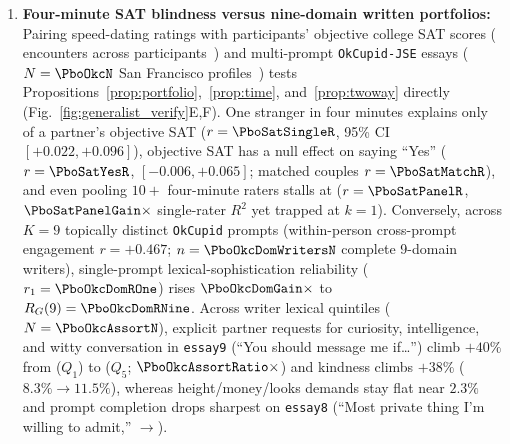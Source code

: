 \begin{enumerate}[leftmargin=1.4em,itemsep=1.5pt,topsep=2pt]
\item \textbf{Four-minute SAT blindness versus nine-domain written portfolios:} Pairing speed-dating ratings with participants' objective college SAT scores (\PboSatDatesN{} encounters across \PboSatPartN{} participants~\cite{fisman2006}) and \PboOkcEssaysN{} multi-prompt \texttt{OkCupid-JSE} essays ($N=\PboOkcN$ San Francisco profiles~\cite{kim2015}) tests Propositions~\ref{prop:portfolio},~\ref{prop:time}, and~\ref{prop:twoway} directly (Fig.~\ref{fig:generalist_verify}E,F). One stranger in four minutes explains only \PboSatSingleRTwo{} of a partner's objective SAT ($r=\PboSatSingleR$, 95\% CI $[+0.022,+0.096]$), objective SAT has a null effect on saying ``Yes'' ($r=\PboSatYesR$, $[-0.006,+0.065]$; matched couples $r=\PboSatMatchR$), and even pooling $10+$ four-minute raters stalls at \PboSatPanelRTwo{} ($r=\PboSatPanelR$, $\PboSatPanelGain\times$ single-rater $R^2$ yet trapped at $k=1$). Conversely, across $K=9$ topically distinct \texttt{OkCupid} prompts (within-person cross-prompt engagement $r=+0.467$; $n=\PboOkcDomWritersN$ complete 9-domain writers), single-prompt lexical-sophistication reliability ($r_1=\PboOkcDomROne$) rises $\PboOkcDomGain\times$ to $R_G(9)=\PboOkcDomRNine$. Across writer lexical quintiles ($N=\PboOkcAssortN$), explicit partner requests for curiosity, intelligence, and witty conversation in \texttt{essay9} (``You should message me if\dots'') climb $+40\%$ from \PboOkcAssortLo{} ($Q_1$) to \PboOkcAssortHi{} ($Q_5$; $\PboOkcAssortRatio\times$) and kindness climbs $+38\%$ ($8.3\%\to 11.5\%$), whereas height/money/looks demands stay flat near $2.3\%$ and prompt completion drops sharpest on \texttt{essay8} (``Most private thing I'm willing to admit,'' \PboOkcSelfPct{}$\to$\PboOkcPrivPct{}).
\end{enumerate}

